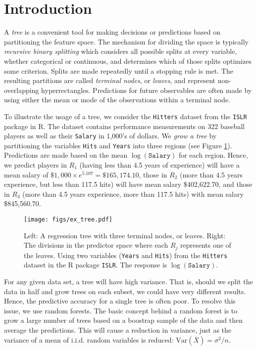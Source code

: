 \section{Introduction} %

A \emph{tree} is a convenient tool for making decisions or predictions based on partitioning the feature space. The mechanism for dividing the space is typically \emph{recursive binary splitting} which considers all possible splits at every variable, whether categorical or continuous, and determines which of those splits optimizes some criterion. Splits are made repeatedly until a stopping rule is met. The resulting partitions are called \emph{terminal nodes}, or \emph{leaves}, and represent non-overlapping hyperrectangles. Predictions for future observables are often made by using either the mean or mode of the observations within a terminal node.

To illustrate the usage of a tree, we consider the \texttt{Hitters} dataset from the \texttt{ISLR} package in R. The dataset contains performance measurements on $322$ baseball players as well as their \texttt{Salary} in 1,000's of dollars. We \emph{grow a tree} by partitioning the variables \texttt{Hits} and \texttt{Years} into three regions (see Figure \ref{tree1}). Predictions are made based on the mean $\log(\mathtt{Salary})$ for each region. Hence, we predict players in $R_1$ (having less than 4.5 years of experience) will have a mean salary of $\$1,000\times e^{5.107}=\$165,174.10$, those in $R_2$ (more than 4.5 years experience, but less than 117.5 hits) will have mean salary \$402,622.70, and those in $R_3$ (more than 4.5 years experience, more than 117.5 hits) with mean salary \$845,560.70. %

\begin{figure}
\begin{center}
\texttt{[image: figs/ex\_tree.pdf]}
\caption{Left: A regression tree with three terminal nodes, or leaves. Right: The divisions in the predictor space where each $R_j$ represents one of the leaves. Using two variables (\texttt{Years} and \texttt{Hits}) from the \texttt{Hitters} dataset in the R package \texttt{ISLR}. The response is $\log(\mathtt{Salary})$.}
\label{tree1}
\end{center}
\end{figure}

For any given data set, a tree will have high variance. That is, should we split the data in half and grow trees on each subset, we could have very different results. Hence, the predictive accuracy for a single tree is often poor. To resolve this issue, we use random forests. The basic concept behind a random forest is to grow a large number of trees based on a boostrap sample of the data and then average the predictions. This will cause a reduction in variance, just as the variance of a mean of i.i.d. random variables is reduced: $\mathrm{Var}(\overline{X}) = \sigma^2/n$.

